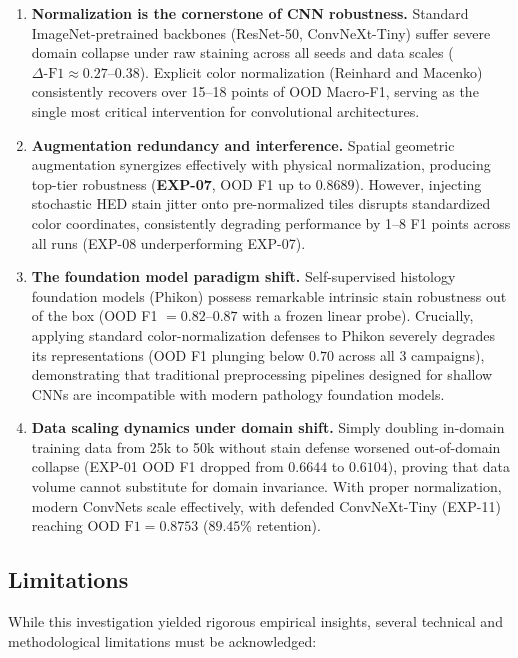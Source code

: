 \documentclass[11pt,a4paper]{article}
\begin{document}
\begin{enumerate}
  \item \textbf{Normalization is the cornerstone of CNN robustness.} Standard
        ImageNet-pretrained backbones (ResNet-50, ConvNeXt-Tiny) suffer severe domain
        collapse under raw staining across all seeds and data scales
        ($\Delta\text{-F1} \approx 0.27$--$0.38$). Explicit color normalization
        (Reinhard and Macenko) consistently recovers over 15--18 points of OOD Macro-F1,
        serving as the single most critical intervention for convolutional architectures.
  \item \textbf{Augmentation redundancy and interference.} Spatial geometric
        augmentation synergizes effectively with physical normalization, producing
        top-tier robustness (\textbf{EXP-07}, OOD F1 up to $0.8689$). However,
        injecting stochastic HED stain jitter onto pre-normalized tiles disrupts
        standardized color coordinates, consistently degrading performance by 1--8 F1
        points across all runs (EXP-08 underperforming EXP-07).
  \item \textbf{The foundation model paradigm shift.} Self-supervised histology
        foundation models (Phikon) possess remarkable intrinsic stain robustness out
        of the box (OOD F1 $= 0.82$--$0.87$ with a frozen linear probe). Crucially,
        applying standard color-normalization defenses to Phikon severely degrades its
        representations (OOD F1 plunging below $0.70$ across all 3 campaigns),
        demonstrating that traditional preprocessing pipelines designed for shallow CNNs
        are incompatible with modern pathology foundation models.
  \item \textbf{Data scaling dynamics under domain shift.} Simply doubling in-domain
        training data from 25k to 50k without stain defense worsened out-of-domain
        collapse (EXP-01 OOD F1 dropped from $0.6644$ to $0.6104$), proving that data
        volume cannot substitute for domain invariance. With proper normalization,
        modern ConvNets scale effectively, with defended ConvNeXt-Tiny (EXP-11)
        reaching $\text{OOD F1} = 0.8753$ ($89.45\%$ retention).
\end{enumerate}

\subsection{Limitations}
While this investigation yielded rigorous empirical insights, several technical and
methodological limitations must be acknowledged:
\end{document}
